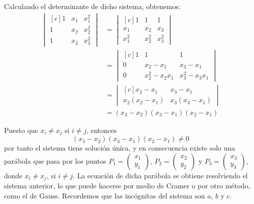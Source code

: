 Calculando el determinante de dicho sistema, obtenemos:
\begin{align*}
\begin{vmatrix*}[c]
1 & x_1 & x_1^2 \\
1 & x_2 & x_2^2 \\
1 & x_3 & x_3^2
\end{vmatrix*} &= 
\begin{vmatrix*}[c]
1 & 1 & 1 \\
x_1 & x_2 & x_3 \\
x_1^2 & x_2^2 & x_3^2
\end{vmatrix*} \\
&=
\begin{vmatrix*}[c]
1 & 1 & 1 \\
0 & x_2-x_1 & x_3-x_1 \\
0 & x_2^2-x_2x_1 & x_3^2-x_3x_1
\end{vmatrix*} \\
&=
\begin{vmatrix*}[c]
x_2-x_1 & x_3-x_1 \\
x_2(x_2-x_1) & x_3(x_3-x_1)
\end{vmatrix*} \\
&=(x_3-x_2)(x_3-x_1)(x_2-x_1)
\end{align*}

Puesto que $x_i \neq x_j$ si $i \neq j$, entonces
$$\left(x_3-x_2\right)\left(x_3-x_1\right)\left(x_2-x_1\right) \neq 0$$
por tanto el sistema tiene solución única, y en consecuencia existe solo una parábola que pasa por los puntos $P_1 = \begin{pmatrix}
    x_1 \\
    y_1
\end{pmatrix}$, $P_2 = \begin{pmatrix}
    x_2 \\
    y_2
\end{pmatrix}$ y $P_3 = \begin{pmatrix}
    x_3 \\
    y_3
\end{pmatrix}$, donde $x_i \neq x_j$, si $i \neq j$. La ecuación de dicha parábola se obtiene resolviendo el sistema anterior, lo que puede hacerse por medio de Cramer o por otro método, como el de Gauss. Recordemos que las incógnitas del sistema son $a$, $b$ y $c$.

